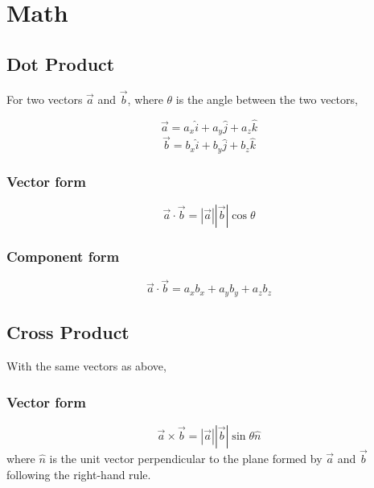 \section{Math}
\subsection{Dot Product}
For two vectors \( \vec{a} \) and \( \vec{b} \), where \( \theta \) is the angle between the two vectors,

\begin{equation}
    \vec{a} = a_x \hat{i} + a_y \hat{j} + a_z \hat{k}
\end{equation}
\begin{equation}
    \vec{b} = b_x \hat{i} + b_y \hat{j} + b_z \hat{k}
\end{equation}

\subsubsection{Vector form}
\begin{equation}
    \vec{a} \cdot \vec{b} = |\vec{a}| |\vec{b}| \cos\theta
\end{equation}
\subsubsection{Component form}
\begin{equation}
    \vec{a} \cdot \vec{b} = a_x b_x + a_y b_y + a_z b_z
\end{equation}

\subsection{Cross Product}
With the same vectors as above,
\subsubsection{Vector form}
\begin{equation}
    \vec{a} \times \vec{b} = |\vec{a}| |\vec{b}| \sin\theta \hat{n}
\end{equation}
where \( \hat{n} \) is the unit vector perpendicular to the plane formed by \( \vec{a} \) and \( \vec{b} \) following the right-hand rule.
